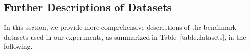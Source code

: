 \subsection{Further Descriptions of Datasets} \label{app.dataset}
In this section, we provide more comprehensive descriptions of the benchmark datasets used in our experiments, as summarized in Table~\ref{table.datasets},
in the following.

